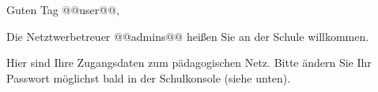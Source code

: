 Guten Tag @@user@@,

\vspace{2mm}

Die Netztwerbetreuer @@admins@@ heißen Sie an der Schule willkommen.

\vspace{2mm}

Hier sind Ihre Zugangsdaten zum pädagogischen Netz. Bitte ändern Sie Ihr Passwort möglichst bald in der Schulkonsole (siehe unten). 


